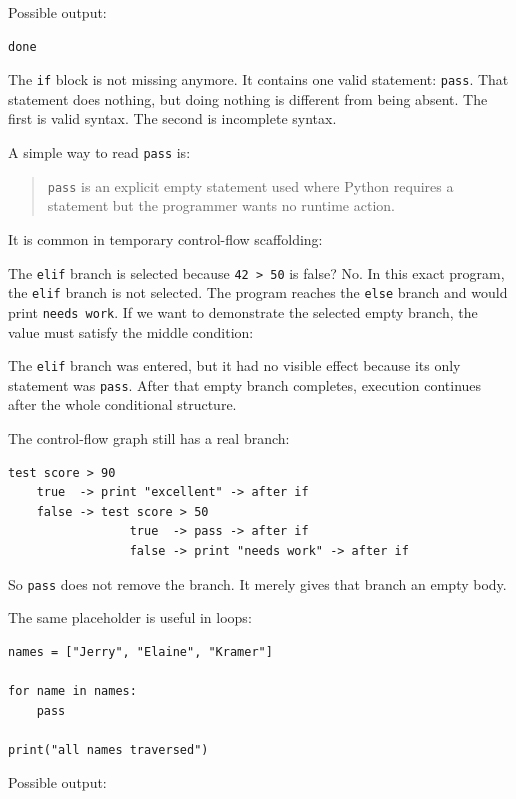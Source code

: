 Possible output:

\begin{verbatim}
done
\end{verbatim}

The \texttt{if} block is not missing anymore. It contains one valid statement: \texttt{pass}. That statement does nothing, but doing nothing is different from being absent. The first is valid syntax. The second is incomplete syntax.

A simple way to read \texttt{pass} is:

\begin{quote}
\texttt{pass} is an explicit empty statement used where Python requires a statement but the programmer wants no runtime action.
\end{quote}

It is common in temporary control-flow scaffolding:

The \texttt{elif} branch is selected because \texttt{42 > 50} is false? No. In this exact program, the \texttt{elif} branch is not selected. The program reaches the \texttt{else} branch and would print \texttt{needs work}. If we want to demonstrate the selected empty branch, the value must satisfy the middle condition:

The \texttt{elif} branch was entered, but it had no visible effect because its only statement was \texttt{pass}. After that empty branch completes, execution continues after the whole conditional structure.

The control-flow graph still has a real branch:

\begin{verbatim}
test score > 90
    true  -> print "excellent" -> after if
    false -> test score > 50
                 true  -> pass -> after if
                 false -> print "needs work" -> after if
\end{verbatim}

So \texttt{pass} does not remove the branch. It merely gives that branch an empty body.

The same placeholder is useful in loops:

\begin{verbatim}
names = ["Jerry", "Elaine", "Kramer"]

for name in names:
    pass

print("all names traversed")
\end{verbatim}

Possible output:

